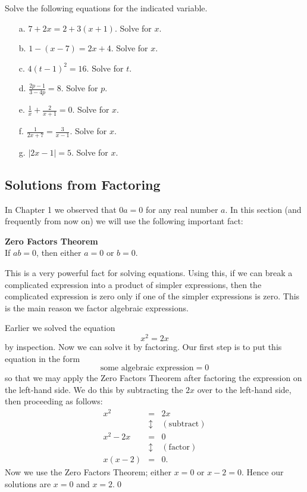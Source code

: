 \par

\begin{question} Solve the following equations for the indicated variable.
\begin{enumerate}
\item[a.] $7+2x = 2+3(x+1)$. Solve for $x$.
\item[b.] $1-(x-7) = 2x+4$. Solve for $x$.
\item[c.] $4(t-1)^2 = 16$. Solve for $t$.
\item[d.] $\frac{2p-1}{3-4p} = 8$. Solve for $p$.
\item[e.] $\frac{1}{x} + \frac{2}{x+1} = 0$. Solve for $x$.
\item[f.] $\frac{1}{2x+7} = \frac{3}{x-1}$. Solve for $x$.
\item[g.] $|2x-1| = 5$. Solve for $x$. 
\end{enumerate}
\end{question}

\subsection{Solutions from Factoring}

In Chapter 1 we observed that $0a=0$ for any real number $a$. In this section (and frequently from now on) we will use the following important fact:

\par

\begin{tcolorbox}
{\bf Zero Factors Theorem}\\
If $ab=0$, then either $a=0$ or $b=0$.
\end{tcolorbox} 

This is a very powerful fact for solving equations. Using this, if we can break a complicated expression into a product of simpler expressions, then the complicated expression is zero only if one of the simpler expressions is zero. This is the main reason we factor algebraic expressions.

\par

\begin{eg} Earlier we solved the equation 
\[
x^2 = 2x
\]
by inspection. Now we can solve it by factoring. Our first step is to put this equation in the form
\[
\mbox{some algebraic expression}=0
\]
so that we may apply the Zero Factors Theorem after factoring the expression on the left-hand side. We do this by subtracting the $2x$ over to the left-hand side, then proceeding as follows:
\begin{eqnarray*}
x^2 & = & 2x\\
& \updownarrow & (\mbox{subtract})\\
x^2-2x & = & 0\\
& \updownarrow & (\mbox{factor}) \\
x(x-2) & = & 0.
\end{eqnarray*}
Now we use the Zero Factors Theorem; either $x=0$ or $x-2 = 0$. Hence our solutions are $x=0$ and $x=2$.\qed \end{eg}

